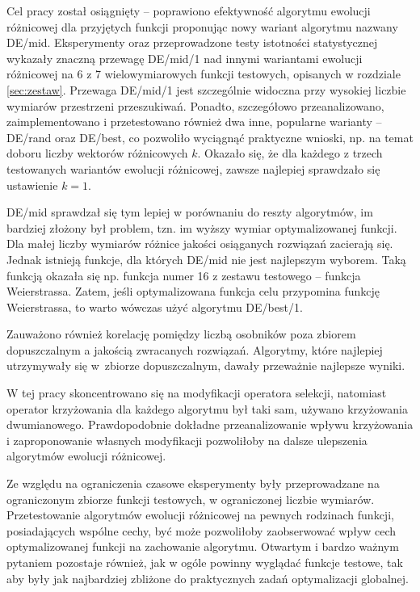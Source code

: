 \documentclass[a4paper,onecolumn,oneside,12pt,wide,floatssmall]{mwrep}
\theoremstyle{definition}
\theoremstyle{plain}%
\theoremstyle{remark}
\begin{document}
Cel pracy został osiągnięty -- poprawiono efektywność algorytmu ewolucji różnicowej dla przyjętych funkcji
proponując nowy wariant algorytmu nazwany DE/mid. Eksperymenty oraz przeprowadzone testy istotności 
statystycznej wykazały znaczną przewagę DE/mid/1 nad innymi wariantami ewolucji różnicowej
na 6 z 7 wielowymiarowych funkcji testowych, opisanych w rozdziale \ref{sec:zestaw}. 
Przewaga DE/mid/1 jest szczególnie widoczna przy wysokiej liczbie wymiarów przestrzeni przeszukiwań. 
Ponadto, szczegółowo przeanalizowano, zaimplementowano 
i przetestowano również dwa inne, popularne warianty -- DE/rand oraz DE/best, co pozwoliło wyciągnąć 
praktyczne wnioski, np. na temat doboru liczby wektorów różnicowych $k$.
Okazało się, że dla każdego z trzech testowanych wariantów ewolucji różnicowej, zawsze
najlepiej sprawdzało się ustawienie $k = 1$.

DE/mid sprawdzał się tym lepiej w porównaniu do reszty algorytmów, im bardziej
złożony był problem, tzn. im wyższy wymiar optymalizowanej funkcji. Dla małej liczby wymiarów
różnice jakości osiąganych rozwiązań zacierają się. Jednak istnieją funkcje, dla których DE/mid nie jest najlepszym wyborem. Taką funkcją okazała się np.
funkcja numer 16 z zestawu testowego -- funkcja Weierstrassa. Zatem, jeśli optymalizowana funkcja celu
przypomina funkcję Weierstrassa, to warto wówczas użyć algorytmu DE/best/1.

Zauważono również korelację pomiędzy liczbą osobników poza zbiorem dopuszczalnym
a jakością zwracanych rozwiązań. Algorytmy, które najlepiej utrzymywały się w~zbiorze 
dopuszczalnym, dawały przeważnie najlepsze wyniki. 


W tej pracy skoncentrowano się na modyfikacji operatora selekcji, natomiast operator krzyżowania
dla każdego algorytmu był taki sam, używano krzyżowania dwumianowego. Prawdopodobnie dokładne
przeanalizowanie wpływu krzyżowania i zaproponowanie własnych modyfikacji 
pozwoliłoby na dalsze ulepszenia algorytmów ewolucji różnicowej. 

Ze względu na ograniczenia czasowe eksperymenty były przeprowadzane na ograniczonym zbiorze
funkcji testowych, w ograniczonej liczbie wymiarów. Przetestowanie algorytmów ewolucji
różnicowej na pewnych rodzinach funkcji, posiadających wspólne cechy, być może pozwoliłoby
zaobserwować wpływ cech optymalizowanej funkcji na zachowanie algorytmu. 
Otwartym i bardzo ważnym pytaniem pozostaje również, jak w ogóle powinny wyglądać funkcje testowe, 
tak aby były jak najbardziej zbliżone do praktycznych zadań
optymalizacji globalnej.
\end{document}
